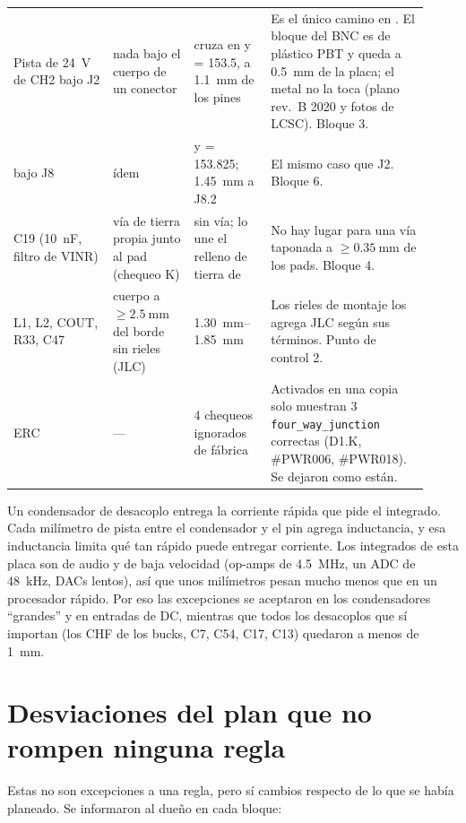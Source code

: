 \begin{longtable}{@{}L{0.22\linewidth}L{0.18\linewidth}L{0.17\linewidth}L{0.35\linewidth}@{}}
Pista de \SI{24}{\volt} de CH2 bajo J2 & nada bajo el cuerpo de un conector & cruza en y = \num{153.5}, a \SI{1.1}{\milli\meter} de los pines &
Es el único camino en . El bloque del BNC es de plástico PBT y queda a \SI{0.5}{\milli\meter} de la placa; el metal no la toca (plano rev.~B 2020 y fotos de LCSC). Bloque 3.\\
 bajo J8 & ídem & y = \num{153.825}; \SI{1.45}{\milli\meter} a J8.2 &
El mismo caso que J2. Bloque 6.\\
C19 (\SI{10}{\nano\farad}, filtro de VINR) & vía de tierra propia junto al pad (chequeo K) & sin vía; lo une el relleno de tierra de  &
No hay lugar para una vía taponada a $\ge\SI{0.35}{\milli\meter}$ de los pads. Bloque 4.\\
L1, L2, COUT, R33, C47 & cuerpo a $\ge\SI{2.5}{\milli\meter}$ del borde sin rieles (JLC) & \SIrange{1.30}{1.85}{\milli\meter} &
Los rieles de montaje los agrega JLC según sus términos. Punto de control 2.\\
ERC & --- & 4 chequeos ignorados de fábrica &
Activados en una copia solo muestran 3 \texttt{four\_way\_junction} correctas (D1.K, \#PWR006, \#PWR018). Se dejaron como están.\\
\bottomrule
\end{longtable}

\begin{idea}
Un condensador de desacoplo entrega la corriente rápida que pide el integrado. Cada milímetro de pista entre el
condensador y el pin agrega inductancia, y esa inductancia limita qué tan
rápido puede entregar corriente. Los integrados de esta placa son de audio y de baja velocidad (op-amps de
\SI{4.5}{\mega\hertz}, un ADC de \SI{48}{\kilo\hertz}, DACs lentos), así que unos milímetros pesan mucho menos que en
un procesador rápido. Por eso las excepciones se aceptaron en los condensadores ``grandes'' y en entradas de DC,
mientras que todos los desacoplos que sí importan (los CHF de los bucks, C7, C54, C17, C13) quedaron a menos de
\SI{1}{\milli\meter}.
\end{idea}

\section{Desviaciones del plan que no rompen ninguna regla}\label{sec:c12-desviaciones}

Estas no son excepciones a una regla, pero sí cambios respecto de lo que se había planeado. Se informaron al dueño en
cada bloque:

